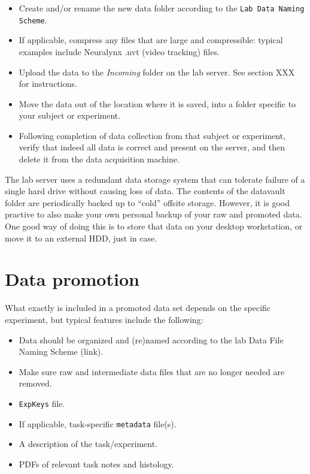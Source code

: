 \documentclass{tufte-book}
\newcommand{\doccls}[1]{\texttt{#1}}%
\begin{document}
\begin{itemize}
\item{Create and/or rename the new data folder according to the
  \doccls{Lab Data Naming Scheme}.}
\item{If applicable, compress any files that are large and
  compressible: typical examples include Neuralynx .nvt (video
  tracking) files.}
\item{Upload the data to the {\it Incoming} folder on the lab
  server. See section XXX for instructions.}
\item{Move the data out of the location where it is saved, into a
  folder specific to your subject or experiment.}
\item{Following completion of data collection from that subject or
  experiment, verify that indeed all data is correct and present on
  the server, and then delete it from the data acquisition
  machine.}
\end{itemize}

The lab server uses a redundant data storage system that can tolerate
failure of a single hard drive without causing loss of data. The
contents of the datavault folder are periodically backed up to
``cold'' offsite storage. However, it is good practive to also make
your own personal backup of your raw and promoted data. One good way
of doing this is to store that data on your desktop workstation, or
move it to an external HDD, just in case.

\section{Data promotion}

What exactly is included in a promoted data set depends on the
specific experiment, but typical features include the following:

\begin{itemize}
\item{Data should be organized and (re)named according to the lab Data
File Naming Scheme (link).}
\item{Make sure raw and intermediate data files that are no longer
  needed are removed.}
\item{\doccls{ExpKeys} file.}
\item{If applicable, task-specific \doccls{metadata} file(s).}
\item{A description of the task/experiment.}
\item{PDFs of relevant task notes and histology.}
\end{itemize}
\end{document}
